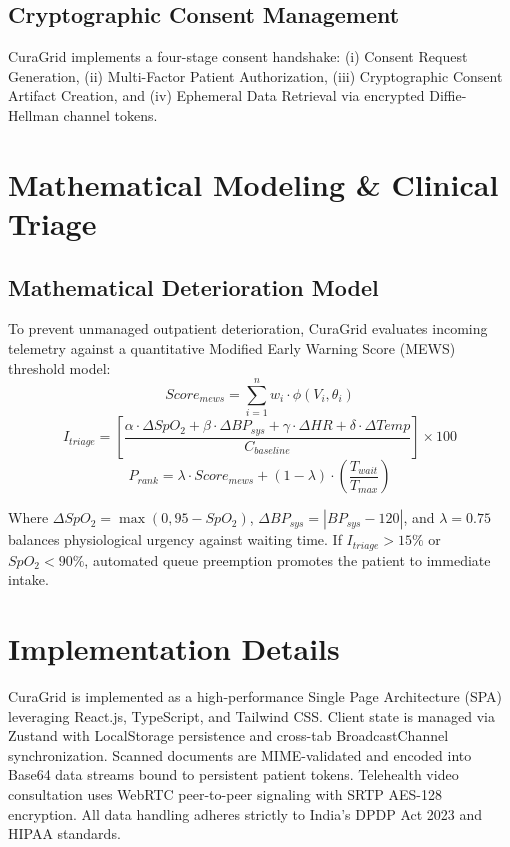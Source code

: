 \documentclass[conference]{IEEEtran}
\begin{document}
\subsection{Cryptographic Consent Management}
CuraGrid implements a four-stage consent handshake: (i) Consent Request Generation, (ii) Multi-Factor Patient Authorization, (iii) Cryptographic Consent Artifact Creation, and (iv) Ephemeral Data Retrieval via encrypted Diffie-Hellman channel tokens.

\section{Mathematical Modeling \& Clinical Triage}
\subsection{Mathematical Deterioration Model}
To prevent unmanaged outpatient deterioration, CuraGrid evaluates incoming telemetry against a quantitative Modified Early Warning Score (MEWS) threshold model:
\begin{equation}
Score_{mews} = \sum_{i=1}^n w_i \cdot \phi(V_i, \theta_i)
\end{equation}
\begin{equation}
I_{triage} = \left[ \frac{\alpha \cdot \Delta SpO_2 + \beta \cdot \Delta BP_{sys} + \gamma \cdot \Delta HR + \delta \cdot \Delta Temp}{C_{baseline}} \right] \times 100
\end{equation}
\begin{equation}
P_{rank} = \lambda \cdot Score_{mews} + (1 - \lambda) \cdot \left( \frac{T_{wait}}{T_{max}} \right)
\end{equation}

Where $\Delta SpO_2 = \max(0, 95 - SpO_2)$, $\Delta BP_{sys} = |BP_{sys} - 120|$, and $\lambda = 0.75$ balances physiological urgency against waiting time. If $I_{triage} > 15\%$ or $SpO_2 < 90\%$, automated queue preemption promotes the patient to immediate intake.

\section{Implementation Details}
CuraGrid is implemented as a high-performance Single Page Architecture (SPA) leveraging React.js, TypeScript, and Tailwind CSS. Client state is managed via Zustand with LocalStorage persistence and cross-tab BroadcastChannel synchronization. Scanned documents are MIME-validated and encoded into Base64 data streams bound to persistent patient tokens. Telehealth video consultation uses WebRTC peer-to-peer signaling with SRTP AES-128 encryption. All data handling adheres strictly to India's DPDP Act 2023 and HIPAA standards.
\end{document}
